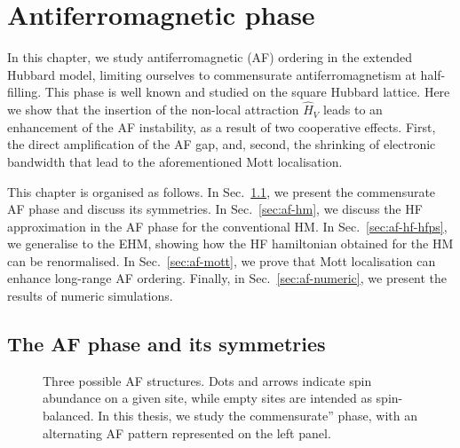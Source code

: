 \def\GraphicsFolder{chapters/antiferromagnetic-instability/pictures}
\chapter{Antiferromagnetic phase}\label{chap:af}

In this chapter, we study antiferromagnetic (AF) ordering in the extended Hubbard model, limiting ourselves to commensurate antiferromagnetism at half-filling. This phase is well known and studied on the square Hubbard lattice. Here we show that the insertion of the non-local attraction $\hat H_V$ leads to an enhancement of the AF instability, as a result of two cooperative effects. First, the direct amplification of the AF gap, and, second, the shrinking of electronic bandwidth that lead to the aforementioned Mott localisation.

This chapter is organised as follows. In Sec.~\ref{sec:af-phase-theory}, we present the commensurate AF phase and discuss its symmetries. In Sec.~\ref{sec:af-hm}, we discuss the HF approximation in the AF phase for the conventional HM. In Sec.~\ref{sec:af-hf-hfps}, we generalise to the EHM, showing how the HF hamiltonian obtained for the HM can be renormalised. In Sec.~\ref{sec:af-mott}, we prove that Mott localisation can enhance long-range AF ordering. Finally, in Sec.~\ref{sec:af-numeric}, we present the results of numeric simulations.

\section{The AF phase and its symmetries}\label{sec:af-phase-theory}

\begin{figure}
	\centering
	
	\caption{Three possible AF structures. Dots and arrows indicate spin abundance on a given site, while empty sites are intended as spin-balanced. In this thesis, we study the commensurate'' phase, with an alternating AF pattern represented on the left panel.}
	\label{fig:antiferromagnets}
\end{figure}

